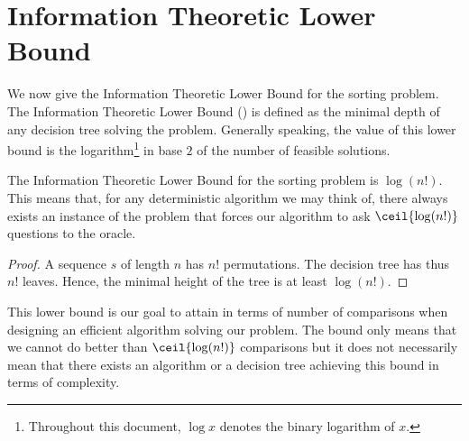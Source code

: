 \section{Information Theoretic Lower Bound}
\label{tree:sorting:ITLB}

We now give the Information Theoretic Lower Bound for the sorting problem. The
Information Theoretic Lower Bound (\ITLB) is defined as the minimal depth of any
decision tree solving the problem. Generally speaking, the value of this lower
bound is the logarithm\footnote{Throughout this document, \(\log x\) denotes the binary logarithm of \(x\).}
in base \(2\) of the number of feasible solutions.

\begin{theorem}
The Information Theoretic Lower Bound for the sorting problem is
\(\log(n!)\). This means that, for any deterministic algorithm we may think of,
there always exists an instance of the problem that forces our
algorithm to ask \(\ceil{\log(n!)}\) questions to the oracle.
\end{theorem}

\begin{proof}
A sequence \(s\) of length \(n\) has \(n!\) permutations. The decision tree has thus
\(n!\) leaves. Hence, the minimal height of the tree is at least \(\log(n!)\).
\end{proof}

This lower bound is our goal to attain in terms of number of comparisons
when designing an efficient algorithm solving our problem. The bound only means
that we cannot do better than \(\ceil{\log(n!)}\) comparisons but it does not
necessarily mean that there exists an algorithm or a decision tree achieving
this bound in terms of complexity.
